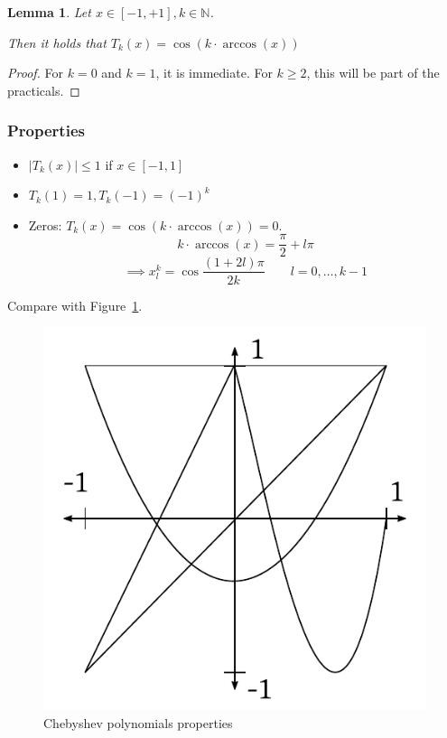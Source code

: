 \documentclass{article}
\newtheorem*{lemma}{Lemma}
\newcommand{\card}[1]{\left|#1\right|}
\begin{document}
\begin{lemma}
  Let $x \in [-1,+1], k \in \mathbb N$.

  Then it holds that $T_k(x) = \cos(k \cdot \arccos(x))$
\end{lemma}

\begin{proof}
  For $k = 0$ and $k = 1$, it is immediate.
  For $k \geq 2$, this will be part of the practicals.
\end{proof}

\subsubsection{Properties}

\begin{itemize}
  \item $\card{T_k(x)} \leq 1$ if $x \in [-1,1]$
  \item $T_k(1) = 1, T_k(-1) = (-1)^k$
  \item Zeros: $T_k(x) = \cos(k \cdot \arccos(x)) = 0$.
    \[ k \cdot \arccos(x) = \frac\pi2  + l \pi \]
    \[ \implies x_l^k = \cos{\frac{(1 + 2l) \pi}{2k}} \qquad l=0,\dots,k-1 \]
\end{itemize}

Compare with Figure~\ref{img:cpp}.

\begin{figure}[t]
  \begin{center}
    \includegraphics{img/03_chebyshev_polynomials_properties.pdf}
    \caption{Chebyshev polynomials properties}
    \label{img:cpp}
  \end{center}
\end{figure}
\end{document}
